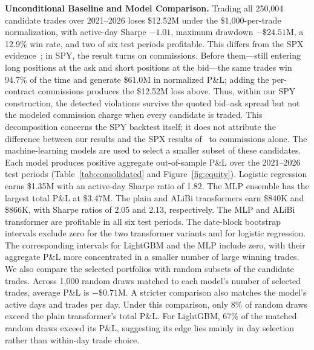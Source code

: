 \documentclass[sigconf,review,anonymous]{acmart}
\begin{document}
\smallskip\noindent\textbf{Unconditional Baseline and Model Comparison.}
Trading all 250{,}004 candidate trades over 2021--2026 loses \$12.52M under the \$1{,}000-per-trade normalization, with active-day Sharpe $-1.01$, maximum drawdown $-\$24.51$M, a 12.9\% win rate, and two of six test periods profitable.
This differs from the SPX evidence~\cite{glasserman2025tp2}; in SPY, the result turns on commissions. Before them---still entering long positions at the ask and short positions at the bid---the same trades win 94.7\% of the time and generate \$61.0M in normalized P\&L; adding the per-contract commissions produces the \$12.52M loss above. Thus, within our SPY construction, the detected violations survive the quoted bid--ask spread but not the modeled commission charge when every candidate is traded. This decomposition concerns the SPY backtest itself; it does not attribute the difference between our results and the SPX results of~\cite{glasserman2025tp2} to commissions alone.
The machine-learning models are used to select a smaller subset of these candidates. Each model produces positive aggregate out-of-sample P\&L over the 2021--2026 test periods (Table~\ref{tab:consolidated} and Figure~\ref{fig:equity}). Logistic regression earns \$1.35M with an active-day Sharpe ratio of 1.82. The MLP ensemble has the largest total P\&L at \$3.47M. The plain and ALiBi transformers earn \$840K and \$866K, with Sharpe ratios of 2.05 and 2.13, respectively. The MLP and ALiBi transformer are profitable in all six test periods.
The date-block bootstrap intervals exclude zero for the two transformer variants and for logistic regression. The corresponding intervals for LightGBM and the MLP include zero, with their aggregate P\&L more concentrated in a smaller number of large winning trades.
We also compare the selected portfolios with random subsets of the candidate trades. Across 1{,}000 random draws matched to each model's number of selected trades, average P\&L is $-\$0.71$M. A stricter comparison also matches the model's active days and trades per day. Under this comparison, only 8\% of random draws exceed the plain transformer's total P\&L. For LightGBM, 67\% of the matched random draws exceed its P\&L, suggesting its edge lies mainly in day selection rather than within-day trade choice.
\end{document}
